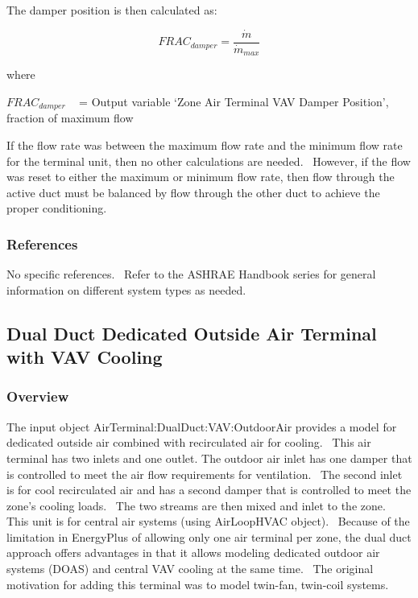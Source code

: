 The damper position is then calculated as:

\begin{equation}
  FRAC_{damper} = \frac{\dot{m}}{\dot{m}_{max}}
\end{equation}

where

\(FRA{C_{damper}}\) ~ = Output variable `Zone Air Terminal VAV Damper Position', fraction of maximum flow

If the flow rate was between the maximum flow rate and the minimum flow rate for the terminal unit, then no other calculations are needed.~ However, if the flow was reset to either the maximum or minimum flow rate, then flow through the active duct must be balanced by flow through the other duct to achieve the proper conditioning.

\subsubsection{References}\label{references-5}

No specific references.~ Refer to the ASHRAE Handbook series for general information on different system types as needed.

\subsection{Dual Duct Dedicated Outside Air Terminal with VAV Cooling}\label{dual-duct-dedicated-outside-air-terminal-with-vav-cooling}

\subsubsection{Overview}\label{overview-5-000}

The input object AirTerminal:DualDuct:VAV:OutdoorAir provides a model for dedicated outside air combined with recirculated air for cooling.~ This air terminal has two inlets and one outlet. The outdoor air inlet has one damper that is controlled to meet the air flow requirements for ventilation.~ The second inlet is for cool recirculated air and has a second damper that is controlled to meet the zone's cooling loads.~ The two streams are then mixed and inlet to the zone.~ This unit is for central air systems (using AirLoopHVAC object). ~Because of the limitation in EnergyPlus of allowing only one air terminal per zone, the dual duct approach offers advantages in that it allows modeling dedicated outdoor air systems (DOAS) and central VAV cooling at the same time.~ The original motivation for adding this terminal was to model twin-fan, twin-coil systems.

